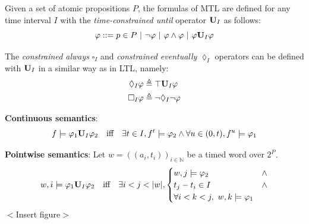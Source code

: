 \documentclass{beamer}
\theoremstyle{definition}
\begin{document}
\begin{frame}
  \small
  \begin{definition}
    Given a set of atomic propositions $P$, the formulas of MTL are defined for any time interval $I$ with the \emph{time-constrained until} operator $\text{\bf U}_I$ as follows:
    \begin{equation*}
      \varphi ::= p \in P\ |\ \neg \varphi\ |\ \varphi \land \varphi\ |\ \varphi \text{\bf U}_I \varphi
    \end{equation*}
  \end{definition}
  \vfill
  The \emph{constrained always} $\square_I$ and \emph{constrained eventually} $\lozenge_I$ operators can be defined with $\text{\bf U}_I$ in a similar way as in LTL, namely:
  \begin{align*}
    \lozenge_I \varphi &\triangleq \top \text{\bf U}_I \varphi\\
    \square_I \varphi &\triangleq \neg \lozenge_I \neg \varphi
  \end{align*}
  \vfill
\end{frame}

\begin{frame}
\textbf{Continuous semantics}:
$$f \models \varphi_1 \text{\bf U}_I \varphi_2 \quad \text{iff} \quad \exists t \in I, f^t \models \varphi_2 \land \forall u \in (0, t), f^u \models \varphi_1$$
\end{frame}

\begin{frame}
\textbf{Pointwise semantics}:
Let $w = ((a_i, t_i))_{i \in \mathbb{N}}$ be a timed word over $2^P$.
\begin{equation*}
  w, i \models \varphi_1 \text{\bf U}_I \varphi_2 \quad \text{iff} \quad
  \exists i < j < |w|,
  \begin{cases}
    w, j \models \varphi_2\ &\land \\
    t_j - t_i \in I\ &\land \\
    \forall i < k < j,\ w, k \models \varphi_1
  \end{cases}
\end{equation*}
$<$Insert figure$>$
\end{frame}
\end{document}
